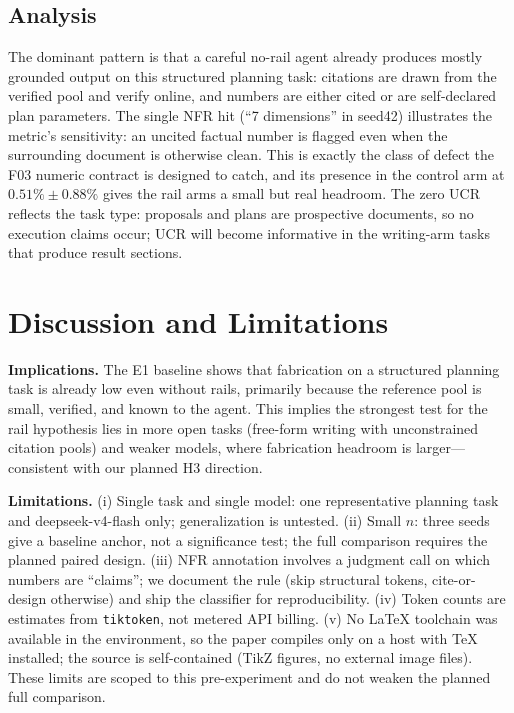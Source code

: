 \documentclass[10pt,twocolumn]{article}
\begin{document}
\subsection{Analysis}
The dominant pattern is that a careful no-rail agent already produces mostly grounded output on this structured planning task: citations are drawn from the verified pool and verify online, and numbers are either cited or are self-declared plan parameters. The single NFR hit (``7 dimensions'' in seed42) illustrates the metric's sensitivity: an uncited factual number is flagged even when the surrounding document is otherwise clean. This is exactly the class of defect the F03 numeric contract is designed to catch, and its presence in the control arm at $0.51\% \pm 0.88\%$ gives the rail arms a small but real headroom. The zero UCR reflects the task type: proposals and plans are prospective documents, so no execution claims occur; UCR will become informative in the writing-arm tasks that produce result sections.

\section{Discussion and Limitations}
\label{sec:discussion}

\textbf{Implications.} The E1 baseline shows that fabrication on a structured planning task is already low even without rails, primarily because the reference pool is small, verified, and known to the agent. This implies the strongest test for the rail hypothesis lies in more open tasks (free-form writing with unconstrained citation pools) and weaker models, where fabrication headroom is larger---consistent with our planned H3 direction.

\textbf{Limitations.} (i) Single task and single model: one representative planning task and deepseek-v4-flash only; generalization is untested. (ii) Small $n$: three seeds give a baseline anchor, not a significance test; the full comparison requires the planned paired design. (iii) NFR annotation involves a judgment call on which numbers are ``claims''; we document the rule (skip structural tokens, cite-or-design otherwise) and ship the classifier for reproducibility. (iv) Token counts are estimates from \texttt{tiktoken}, not metered API billing. (v) No LaTeX toolchain was available in the environment, so the paper compiles only on a host with TeX installed; the source is self-contained (TikZ figures, no external image files). These limits are scoped to this pre-experiment and do not weaken the planned full comparison.
\end{document}
